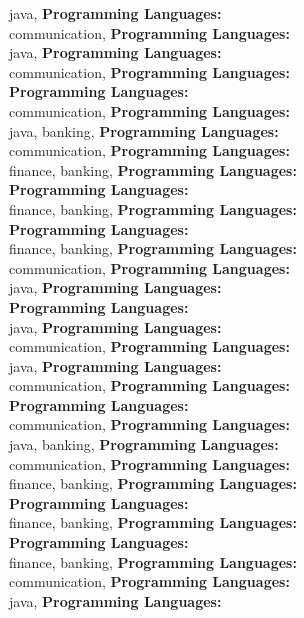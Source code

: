 java, \textbf{Programming Languages:} \\
communication, \textbf{Programming Languages:} \\
java, \textbf{Programming Languages:} \\
communication, \textbf{Programming Languages:} \\
\textbf{Programming Languages:} \\
communication, \textbf{Programming Languages:} \\
java, banking, \textbf{Programming Languages:} \\
communication, \textbf{Programming Languages:} \\
finance, banking, \textbf{Programming Languages:} \\
\textbf{Programming Languages:} \\
finance, banking, \textbf{Programming Languages:} \\
\textbf{Programming Languages:} \\
finance, banking, \textbf{Programming Languages:} \\
communication, \textbf{Programming Languages:} \\
java, \textbf{Programming Languages:} \\
\textbf{Programming Languages:} \\
java, \textbf{Programming Languages:} \\
communication, \textbf{Programming Languages:} \\
java, \textbf{Programming Languages:} \\
communication, \textbf{Programming Languages:} \\
\textbf{Programming Languages:} \\
communication, \textbf{Programming Languages:} \\
java, banking, \textbf{Programming Languages:} \\
communication, \textbf{Programming Languages:} \\
finance, banking, \textbf{Programming Languages:} \\
\textbf{Programming Languages:} \\
finance, banking, \textbf{Programming Languages:} \\
\textbf{Programming Languages:} \\
finance, banking, \textbf{Programming Languages:} \\
communication, \textbf{Programming Languages:} \\
java, \textbf{Programming Languages:} \\
